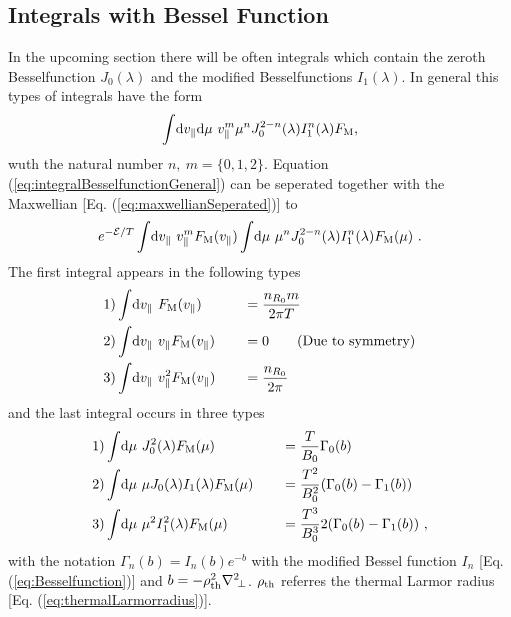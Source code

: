 \subsection*{Integrals with Bessel Function}
\label{sub:integralBesselfunction}

In the upcoming section there will be often integrals which contain the zeroth Besselfunction $J_0(\lambda)$ and the modified Besselfunctions $I_1(\lambda)$. In general this types of integrals have the form
\begin{gather}
	\int \! \mathrm{d}v_\parallel\mathrm{d}\mu~ v_\parallel^m \mu^n J_0^{2-n}(\lambda) I_1^n(\lambda) F_\mathrm{M} ,
	\label{eq:integralBesselfunctionGeneral}
\end{gather}
wuth the natural number $n,~m = \{0, 1, 2\}$. Equation (\ref{eq:integralBesselfunctionGeneral}) can be seperated together with the Maxwellian [Eq. (\ref{eq:maxwellianSeperated})] to
\begin{gather}
	e^{-\mathcal{E}/T} \int \! \mathrm{d}v_\parallel ~ v_\parallel^m F_\mathrm{M}(v_\parallel) \int \! \mathrm{d}\mu ~ \mu^n J_0^{2-n}(\lambda) I_1^n(\lambda) F_\mathrm{M}(\mu) ~.
	\label{eq:integralBesselfunctionGeneralSperated}
\end{gather}
The first integral appears in the following types
\begin{gather}
	\begin{aligned}
		1)& \int \! \mathrm{d}v_\parallel ~         F_\mathrm{M}(v_\parallel) &\quad &= \frac{n_{R_0} m}{2\pi T} \\
		2)& \int \! \mathrm{d}v_\parallel ~ v_\parallel   F_\mathrm{M}(v_\parallel) &\quad &= 0 \qquad \mathrm{(Due~to~symmetry)}\\
		3)& \int \! \mathrm{d}v_\parallel ~ v_\parallel^2 F_\mathrm{M}(v_\parallel) &\quad &= \frac{n_{R_0}}{2\pi} \\
	\end{aligned}
	\label{eq:integralMaxwellian}
\end{gather}
and the last integral occurs in three types
\begin{gather}
	\begin{aligned}
		1)& \int \! \mathrm{d}\mu ~ J_0^2(\lambda) F_\mathrm{M}(\mu) &\quad &= \frac{T}{B_0} \Gamma_0(b) \\
		2)& \int \! \mathrm{d}\mu ~ \mu J_0(\lambda) I_1(\lambda) F_\mathrm{M}(\mu) &\quad &= \frac{T^2}{B_0^2} (\Gamma_0(b) - \Gamma_1(b)) \\
		3)& \int \! \mathrm{d}\mu ~ \mu^2 I_1^2(\lambda) F_\mathrm{M}(\mu) &\quad &= \frac{T^3}{B_0^3} 2 (\Gamma_0(b) - \Gamma_1(b))~, \\
	\end{aligned}
	\label{eq:integralBesselfunction}
\end{gather}
with the notation $\Gamma_n(b) = I_n(b) e^{-b}$ with the modified Bessel function $I_n$ [Eq. (\ref{eq:Besselfunction})] and $b= - \rho_{\mathrm{th}}^2 \nabla^2\!_\perp$. $\rho_{\mathrm{th}}$ referres the thermal Larmor radius [Eq. (\ref{eq:thermalLarmorradius})]. \cite{GKWDerivation}
\newpage
